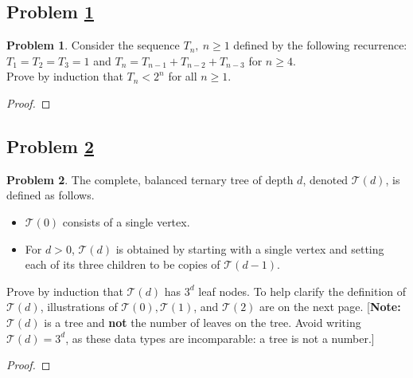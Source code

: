 \documentclass[11pt]{article}
\theoremstyle{definition}
\theoremstyle{definition}
\newtheorem{required}{Problem}
\theoremstyle{definition}
\begin{document}
\newpage
\subsection{Problem \ref{Induction2}} 
\begin{required} \label{Induction2}
Consider the sequence $T_n,~n\geq 1$ defined by the following recurrence: $T_1=T_2=T_3=1$ and $T_n=T_{n-1}+T_{n-2}+T_{n-3}$ for $n\geq 4$. \\

\noindent Prove by induction that $T_{n} < 2^n$ for all $n\geq 1$. 
\end{required}

\begin{proof}
\end{proof}



\newpage
\subsection{Problem \ref{Induction3}}
\begin{required} \label{Induction3}
The complete, balanced ternary tree of depth $d$, denoted $\mathcal{T}(d)$, is defined as follows. 
\begin{itemize}
\item $\mathcal{T}(0)$ consists of a single vertex.
\item For $d > 0$, $\mathcal{T}(d)$ is obtained by starting with a single vertex and setting each of its three children to be copies of $\mathcal{T}(d-1)$.
\end{itemize}

\noindent Prove by induction that $\mathcal{T}(d)$ has $3^{d}$ leaf nodes. To help clarify the definition of $\mathcal{T}(d)$, illustrations of $\mathcal{T}(0), \mathcal{T}(1)$, and $\mathcal{T}(2)$ are on the next page. [\textbf{Note:} $\mathcal{T}(d)$ is a tree and \textbf{not} the number of leaves on the tree. Avoid writing $\mathcal{T}(d) = 3^{d}$, as these data types are incomparable: a tree is not a number.]
\end{required}

\begin{proof}
\end{proof}
\end{document}
